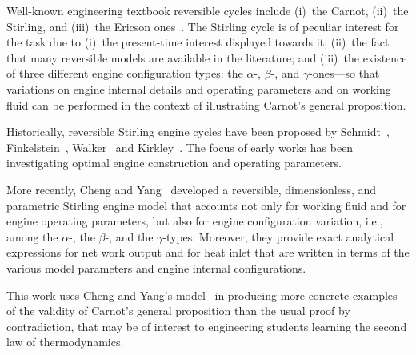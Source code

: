     Well-known engineering textbook reversible cycles include (i)~the Carnot, (ii)~the Stirling,
    and (iii)~the Ericson  ones~\cite{2013-CengelYA+BolesMA-AMGH}.  The  Stirling  cycle  is  of
    peculiar interest for the task due to (i)~the present-time interest  displayed  towards  it;
    (ii)~the fact that many reversible models are available in  the  literature;  and  (iii)~the
    existence of three different  engine  configuration  types:  the  $\alpha$-,  $\beta$-,  and
    $\gamma$-ones---so that variations on engine internal details and operating  parameters  and
    on working  fluid  can  be  performed  in  the  context  of  illustrating  Carnot's  general
    proposition.

    Historically,   reversible    Stirling    engine    cycles    have    been    proposed    by
    Schmidt~\cite{1871-SchmidtG-ZeitVerDeutschIng},                                             
    Finkelstein~\cite{1960-FinkelsteinT-SAEIntl},   Walker~\cite{1962-WalkerG-JMechEngSci}   and
    Kirkley~\cite{1962-KirkleyDW-JMechEngSci}. The focus of early works has  been  investigating
    optimal engine construction and operating parameters.

    More recently, Cheng and Yang~\cite{2012-ChengCH+YangHS-ApEnergy}  developed  a  reversible,
    dimensionless, and parametric Stirling engine model that accounts not only for working fluid
    and for engine operating parameters, but also  for  engine  configuration  variation,  i.e.,
    among the $\alpha$-, the $\beta$-, and the  $\gamma$-types.  Moreover,  they  provide  exact
    analytical expressions for net work output and for heat inlet that are written in  terms  of
    the various model parameters and engine internal configurations.

    This work uses Cheng and Yang's model~\cite{2012-ChengCH+YangHS-ApEnergy} in producing  more
    concrete examples of the validity of Carnot's general proposition than the  usual  proof  by
    contradiction, that may be of interest to engineering students learning the  second  law  of
    thermodynamics.



